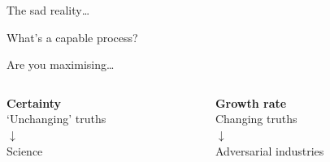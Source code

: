 {
    \begin{frame}{The sad reality\ldots}
    \end{frame}
}

\begin{frame}{What's a capable process?}
    \begin{center}
        \large%
        Are you maximising\ldots
    \end{center}
    \begin{columns}
        \begin{column}{0.5\textwidth}
            \begin{center}
                {\large\bf%
                 Certainty} \\[1em]
                `Unchanging' truths \\[1em]
                $\downarrow$ \\[1em]
                {\large%
                 Science}
            \end{center}
        \end{column}
        \begin{column}{0.5\textwidth}
            \begin{center}
                {\large\bf%
                 Growth rate} \\[1em]
                Changing truths \\[1em]
                $\downarrow$ \\[1em]
                {\large%
                 Adversarial industries}
            \end{center}
        \end{column}
    \end{columns}
\end{frame}

